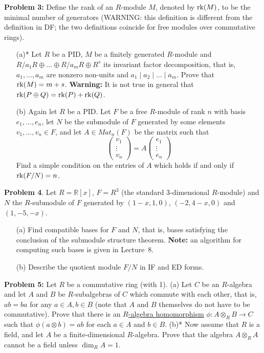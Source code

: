 \documentclass[12pt]{article}
\begin{document}
\skv
{\bf Problem 3:} \rm Define the rank of an $R$-module $M$, denoted by ${\rm rk}(M)$, to be the minimal number of generators (WARNING: this definition is different from the definition in DF; the two definitions coincide for free modules over commutative rings).
\begin{itemize}
\item[(a)*] Let $R$ be a PID,
$M$ be a finitely generated $R$-module and
$R/a_1R\oplus \ldots \oplus R/a_mR\oplus R^s$ its invariant factor
decomposition, that is, $a_1,\ldots, a_m$ are nonzero 
non-units and $a_1\mid a_2\mid\ldots\mid a_m$. Prove that
${\rm rk}(M)=m+s$. {\bf Warning:} It is not true in general that
${\rm rk}(P\oplus Q)={\rm rk}(P)+{\rm rk}(Q)$. 

\item[(b)] Again let $R$ be a PID. Let $F$ be a free $R$-module of rank $n$ with basis 
$e_1,\ldots, e_n$, let $N$ be the submodule of $F$
generated by some elements $v_1,\ldots, v_n\in F$,
and let $A\in Mat_n(F)$ be the matrix such that
$$\left(\begin{array}{c} v_1 \\ \vdots \\ v_n\end{array}\right)=
A \left(\begin{array}{c} e_1 \\ \vdots \\ e_n\end{array}\right)$$ 
Find a simple condition on the entries of $A$ which holds
if and only if ${\rm rk}(F/N)=n$.
\end{itemize}
\skv
{\bf Problem 4}. Let $R=\mathbb R[x]$, $F=R^3$ (the standard 3-dimensional $R$-module)
and $N$ the $R$-submodule of $F$
generated by $(1-x,1,0)$, $(-2,4-x,0)$ and $(1,-5,-x)$.
\begin{itemize}
\item[(a)] Find compatible bases for $F$ and $N$, that is, bases satisfying the conclusion
of the submodule structure theorem. {\bf Note:} an algorithm for computing such bases is given in Lecture~8.
\item[(b)] Describe the quotient module $F/N$ in IF and ED forms.
\end{itemize}
\skv
{\bf Problem 5:} Let $R$ be a commutative ring (with 1).
\skv
(a) Let $C$ be an $R$-algebra and let $A$ and $B$ be $R$-subalgebras of $C$
which commute with each other, that is, $ab=ba$ for any $a\in A, b\in B$
(note that $A$ and $B$ themselves do not have to be commutative).
Prove that there is an \underline{$R$-algebra homomorphism} $\phi:A\otimes_R B\to C$
such that $\phi(a\otimes b)=ab$ for each $a\in A$ and $b\in B$.
\skv
(b)* Now assume that $R$ is a field, and let $A$ be a finite-dimensional
$R$-algebra. Prove that the algebra $A\otimes_R A$ cannot be a field
unless $\dim_R A=1$. 
\newpage
\end{document}
